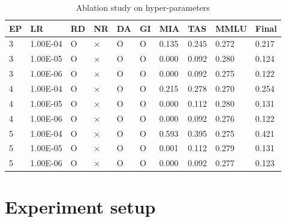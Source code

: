 \documentclass[11pt]{article}
\begin{document}
\begin{table}[t]
  \centering
    \begin{tabular}{|l|l|l|l|l|l|l|l|l|l|}
    \hline
        EP & LR & RD & NR & DA & GI & MIA & TAS & MMLU & Final \\ \hline
        3 & 1.00E-04 & O & × & O & O & 0.135 & 0.245 & 0.272 & 0.217 \\ \hline
        3 & 1.00E-05 & O & × & O & O & 0.000 & 0.092 & 0.280 & 0.124 \\ \hline
        3 & 1.00E-06 & O & × & O & O & 0.000 & 0.092 & 0.275 & 0.122 \\ \hline
        4 & 1.00E-04 & O & × & O & O & 0.215 & 0.278 & 0.270 & 0.254 \\ \hline
        4 & 1.00E-05 & O & × & O & O & 0.000 & 0.112 & 0.280 & 0.131 \\ \hline
        4 & 1.00E-06 & O & × & O & O & 0.000 & 0.092 & 0.276 & 0.122 \\ \hline
        5 & 1.00E-04 & O & × & O & O & 0.593 & 0.395 & 0.275 & 0.421 \\ \hline
        5 & 1.00E-05 & O & × & O & O & 0.001 & 0.112 & 0.279 & 0.131 \\ \hline
        5 & 1.00E-06 & O & × & O & O & 0.000 & 0.092 & 0.277 & 0.123 \\ \hline
    \end{tabular}
  \caption{
    Ablation study on hyper-parameters }
\label{tab:AS1}
\end{table}



\section{Experiment setup}


\end{document}
